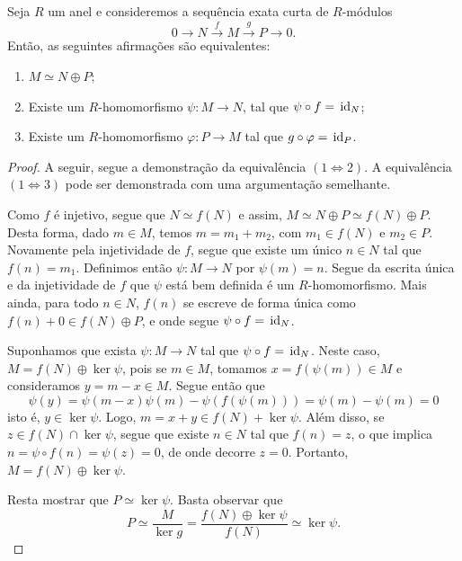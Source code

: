 \begin{prop}\label{prop:alveri}
Seja $R$ um anel e consideremos a sequência exata curta de $R$-módulos
\[0 \rightarrow N \xrightarrow{f} M \xrightarrow{g} P \rightarrow 0.\] Então, as seguintes afirmações são equivalentes:
\begin{enumerate}
    \item $M\simeq N\oplus P$;
    \item Existe um $R$-homomorfismo $\psi:M\rightarrow N$, tal que $\psi\circ f = \, \textrm{id}_{N}$;
    \item Existe um $R$-homomorfismo $\varphi:P \rightarrow M$ tal que $g\circ \varphi = \, \textrm{id}_{P}$.
\end{enumerate}
\begin{proof}
A seguir, segue a demonstração da equivalência $(1\Leftrightarrow 2)$. A equivalência $(1\Leftrightarrow 3)$ pode ser demonstrada com uma argumentação semelhante. \par
Como $f$ é injetivo, segue que $N\simeq f(N)$ e assim, $M\simeq N \oplus P\simeq f(N) \oplus P$. Desta forma, dado $m \in M$, temos $m=m_1+m_2$, com $m_1 \in f(N)$ e $m_2 \in P$. Novamente pela injetividade de $f$, segue que existe um único $n \in N$ tal que $f(n)=m_1$. Definimos então $\psi: M \rightarrow N$ por $\psi(m)=n$. Segue da escrita única e da injetividade de $f$ que $\psi$ está bem definida é um $R$-homomorfismo. %
Mais ainda, para todo $n \in N$, $f(n)$ se escreve de forma única como $f(n) +0 \in f(N)\oplus P$, e onde segue $\psi \circ f = \, \textrm{id}_{N}$. \par 
Suponhamos que exista $\psi:M \rightarrow N$ tal que $\psi \circ f = \, \textrm{id}_{N}$. Neste caso, $M=f(N) \oplus \ker{\psi}$, pois se $m \in M$, tomamos $x = f(\psi(m)) \in M$ e consideramos $y=m-x \in M$. Segue então que \[\psi(y) = \psi(m-x) \psi(m) - \psi(f(\psi(m))) = \psi(m)-\psi(m) =0\]
isto é, $y \in \ker{\psi}$. Logo, $m = x+y \in f(N) + \ker{\psi}$. Além disso, se $z \in f(N) \cap \ker{\psi}$, segue que existe $n\in N$ tal que $f(n)=z$, o que implica $n = \psi \circ f(n) = \psi(z) = 0$, de onde decorre $z=0$. Portanto, $M=f(N) \oplus \ker{\psi}$. \par 
Resta mostrar que $P\simeq \ker{\psi}$. Basta observar que \[P \simeq \dfrac{M}{\ker{g}} = \dfrac{f(N) \oplus \ker{\psi}}{f(N)} \simeq \ker{\psi}.\]
\end{proof}
\end{prop}
